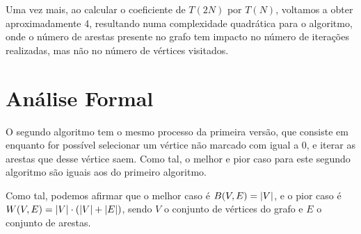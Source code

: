 Uma vez mais, ao calcular o coeficiente de $T(2N)$ por $T(N)$, voltamos a obter
aproximadamente 4, resultando numa complexidade quadrática para o algoritmo,
onde o número de arestas presente no grafo tem impacto no número de iterações
realizadas, mas não no número de vértices visitados.

\section{Análise Formal}

O segundo algoritmo tem o mesmo processo da primeira versão,
que consiste em enquanto for possível selecionar um vértice
não marcado com  igual a 0, e iterar as
arestas que desse vértice saem. Como tal, o melhor e pior
caso para este segundo algoritmo são iguais aos do primeiro
algoritmo.

Como tal, podemos afirmar que o melhor caso é $B(V, E) = \left\lvert V \right\rvert$,
e o pior caso é $W(V,E) = \left\lvert V \right\rvert \cdot \left(\left\lvert V \right\rvert + \left\lvert E \right\rvert\right)$,
sendo $V$ o conjunto de vértices do grafo e $E$ o conjunto de arestas.
